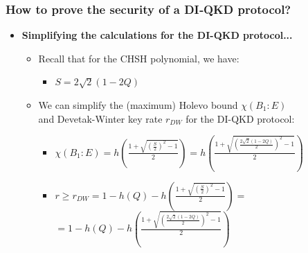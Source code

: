 \documentclass{beamer}
\begin{document}
		\begin{frame}
			\frametitle{\large How to prove the security of a DI‑QKD protocol?}

            \vspace{2ex}
            \begin{itemize}
                \item \textbf{Simplifying the calculations for the DI-QKD protocol...}
                \vspace{-2.5ex}
                \begin{itemize}
                    \item Recall that for the CHSH polynomial, we have:
                    \begin{itemize}
                        \item $S = 2 \sqrt{2}(1 - 2Q)$
                    \end{itemize}
                    \vspace{1ex}
                    \item We can simplify the (maximum) Holevo bound $\chi({B}_{1}:E)$\\ and Devetak-Winter key rate ${r}_{DW}$ for the DI-QKD protocol:
                    \begin{itemize}
                        \item $\chi({B}_{1}:E) = h\left( \frac{1 + \sqrt{{(\frac{S}{2})}^{2} - 1}}{2} \right) = h\left( \frac{1 + \sqrt{{\left(\frac{ 2 \sqrt{2}(1 - 2Q) }{2}\right)}^{2} - 1}}{2} \right)$
                        \item $r \geq {r}_{DW} = 1 - h(Q) - h\left( \frac{1 + \sqrt{{(\frac{S}{2})}^{2} - 1}}{2} \right) = $\\
                        \vspace{0.5ex}
                        \hspace{6.8ex}$= 1 - h(Q) - h\left( \frac{1 + \sqrt{{\left(\frac{ 2 \sqrt{2}(1 - 2Q) }{2}\right)}^{2} - 1}}{2} \right)$
                    \end{itemize}
                \end{itemize}
            \end{itemize}
            
		\end{frame}
\end{document}
